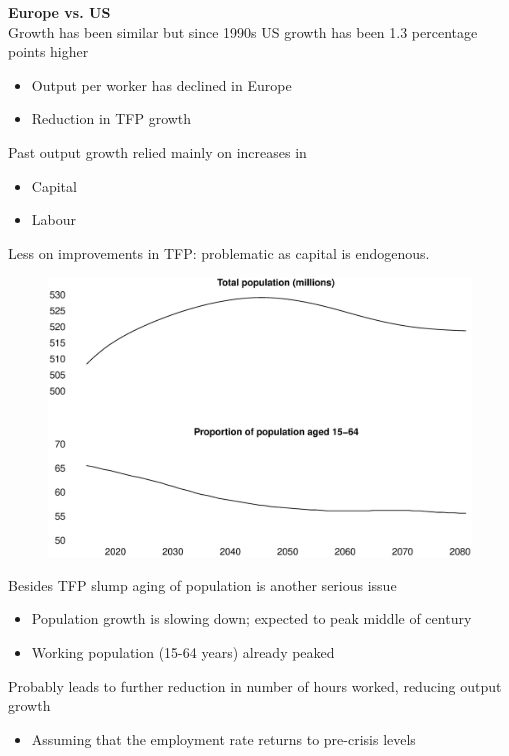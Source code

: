 \documentclass{beamer}
\begin{document}
\begin{frame}
  \textbf{Europe vs. US}\\
  Growth has been similar but since 1990s US growth has been 1.3 percentage points higher
  \begin{itemize}
    \item Output per worker has declined in Europe
    \item Reduction in TFP growth
  \end{itemize}
  \medskip
  Past output growth relied mainly on increases in
  \begin{itemize}
    \item Capital
    \item Labour
  \end{itemize}
  \medskip
  Less on improvements in TFP: problematic as capital is endogenous.
\end{frame}

\begin{frame}
  \begin{figure}
    \includegraphics[scale=.3]{population.eps}
  \end{figure}
\end{frame}

\begin{frame}
  Besides TFP slump aging of population is another serious issue
  \begin{itemize}
    \item Population growth is slowing down; expected to peak middle of century
    \item Working population (15-64 years) already peaked
  \end{itemize}
  \medskip
  Probably leads to further reduction in number of hours worked, reducing output growth
  \begin{itemize}
    \item Assuming that the employment rate returns to pre-crisis levels
  \end{itemize}
\end{frame}
\end{document}
